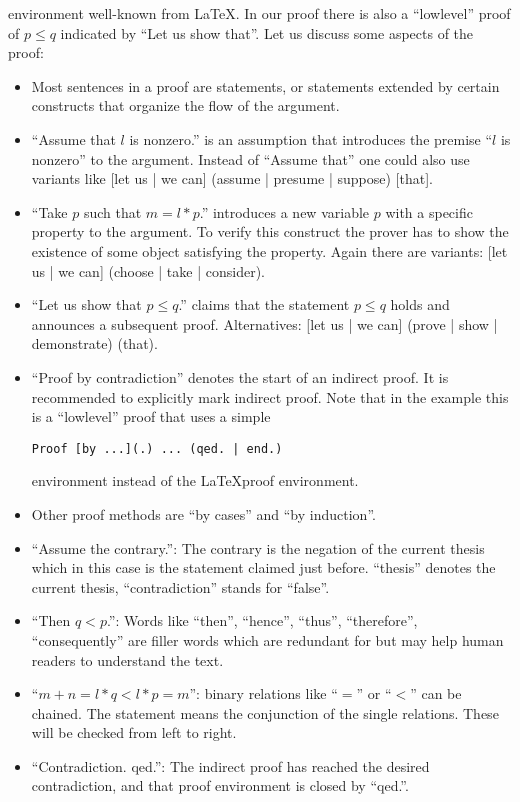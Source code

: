 \documentclass[11pt]{article}
\begin{document}
\noindent environment well-known from \LaTeX.
In our proof there is also a ``lowlevel'' proof of $p \leq q$
indicated by ``Let us show that''. Let us discuss some aspects of the
proof:
\begin{itemize}
\item Most sentences in a proof are statements, or statements
extended by certain constructs that organize the flow of the argument.
\item ``Assume that $l$ is nonzero.'' is an assumption that introduces
the premise ``$l$ is nonzero'' to the argument. Instead of ``Assume that''
one could also use variants like
[let us | we can] (assume | presume | suppose) [that].
\item ``Take $p$ such that $m = l * p$.'' introduces a new variable
$p$ with a specific property to the argument. To verify this construct
the prover has to show the existence of some object satisfying the
property. Again there are variants:
[let us | we can] (choose | take | consider).
\item ``Let us show that $p \leq q$.'' claims that the statement
$p \leq q$ holds and announces a subsequent proof.
Alternatives: [let us | we can] (prove | show | demonstrate) (that).
\item ``Proof by contradiction'' denotes the start of an indirect
proof. It is recommended to explicitly mark indirect proof.
Note that in the example this is a ``lowlevel'' proof that
uses a simple

\verb+Proof [by ...](.) ... (qed. | end.)+

\noindent environment instead of the \LaTeX proof environment.
\item Other proof methods are ``by cases'' and ``by induction''.
\item ``Assume the contrary.'': The contrary is the negation
of the current thesis which in this case is the statement claimed
just before. ``thesis'' denotes the current thesis, ``contradiction''
stands for ``false''.
\item ``Then $q < p$.'': Words like ``then'', ``hence'', ``thus'',
``therefore'', ``consequently'' are filler words which are redundant
for \Naproche but may help human readers to understand the text.
\item ``$m+n = l * q < l * p = m$'': binary relations like ``$=$''
or ``$<$'' can be chained. The statement means the conjunction
of the single relations. These will be checked from
left to right.
\item ``Contradiction. qed.'': The indirect proof has reached the
desired contradiction, and that proof environment is closed by
``qed.''.
\end{itemize}
\end{document}
